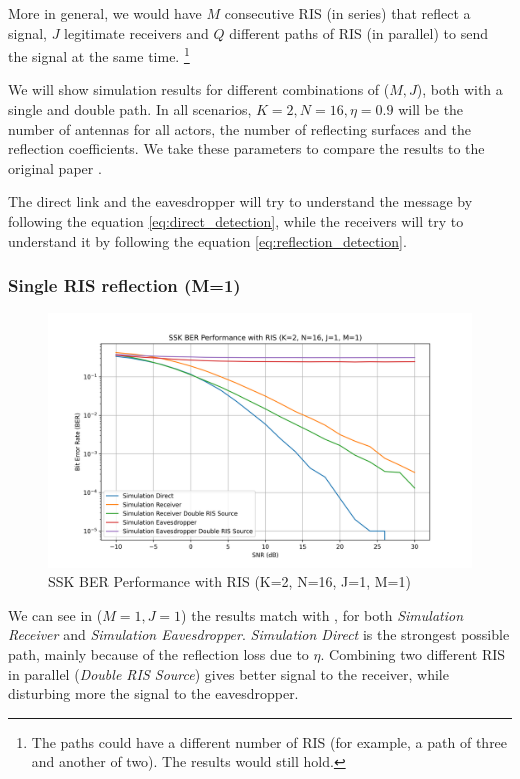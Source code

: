 More in general, we would have $M$ consecutive RIS (in series) that reflect a signal, $J$ legitimate receivers and $Q$ different paths of RIS (in parallel) to send the signal at the same time. \footnote{The paths could have a different number of RIS (for example, a path of three and another of two). The results would still hold.}

We will show simulation results for different combinations of ($M, J$), both with a single and double path. In all scenarios, $K = 2, N = 16, \eta = 0.9$ will be the number of antennas for all actors, the number of reflecting surfaces and the reflection coefficients. We take these parameters to compare the results to the original paper \cite{9328149}.

The direct link and the eavesdropper will try to understand the message by following the equation \eqref{eq:direct_detection}, while the receivers will try to understand it by following the equation \eqref{eq:reflection_detection}.

\subsubsection{Single RIS reflection (M=1)}

\begin{figure}[H]
  \centering
  \includegraphics[width=0.9\linewidth]{imgs/ber-simulations/SSK BER Performance with RIS (K=2, N=16, J=1, M=1).png}
  \caption{SSK BER Performance with RIS (K=2, N=16, J=1, M=1)}
  \label{fig:simulation_j1_m1}
\end{figure}

We can see in ($M=1, J=1$) the results match with \cite{9328149}, for both \textit{Simulation Receiver} and \textit{Simulation Eavesdropper}.
\textit{Simulation Direct} is the strongest possible path, mainly because of the reflection loss due to $\eta$.
Combining two different RIS in parallel (\textit{Double RIS Source}) gives better signal to the receiver, while disturbing more the signal to the eavesdropper.

